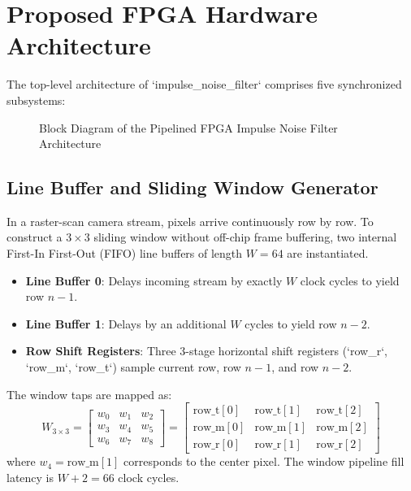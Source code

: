 \documentclass[12pt,a4paper]{article}
\begin{document}
\section{Proposed FPGA Hardware Architecture}

The top-level architecture of `impulse_noise_filter` comprises five synchronized subsystems:

\begin{figure}[htbp]
\centering
{}
\caption{Block Diagram of the Pipelined FPGA Impulse Noise Filter Architecture}
\end{figure}

\subsection{Line Buffer and Sliding Window Generator}
In a raster-scan camera stream, pixels arrive continuously row by row. To construct a $3\times 3$ sliding window without off-chip frame buffering, two internal First-In First-Out (FIFO) line buffers of length $W = 64$ are instantiated.
\begin{itemize}
    \item \textbf{Line Buffer 0}: Delays incoming stream by exactly $W$ clock cycles to yield row $n-1$.
    \item \textbf{Line Buffer 1}: Delays by an additional $W$ cycles to yield row $n-2$.
    \item \textbf{Row Shift Registers}: Three 3-stage horizontal shift registers (`row_r`, `row_m`, `row_t`) sample current row, row $n-1$, and row $n-2$.
\end{itemize}
The window taps are mapped as:
\begin{equation}
W_{3\times 3} = \begin{bmatrix}
w_0 & w_1 & w_2 \\
w_3 & w_4 & w_5 \\
w_6 & w_7 & w_8
\end{bmatrix} = \begin{bmatrix}
\text{row\_t}[0] & \text{row\_t}[1] & \text{row\_t}[2] \\
\text{row\_m}[0] & \text{row\_m}[1] & \text{row\_m}[2] \\
\text{row\_r}[0] & \text{row\_r}[1] & \text{row\_r}[2]
\end{bmatrix}
\end{equation}
where $w_4 = \text{row\_m}[1]$ corresponds to the center pixel. The window pipeline fill latency is $W + 2 = 66$ clock cycles.
\end{document}
